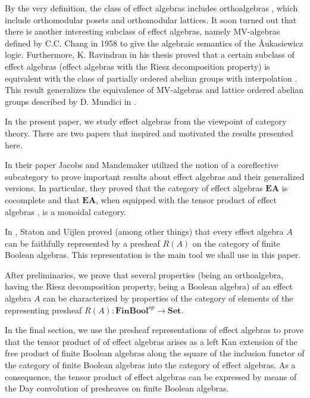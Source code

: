 \documentclass[smallextended]{svjour3}
\begin{document}
By the very definition, the class of effect algebras
includes orthoalgebras \cite{FouGreRut:FaSiO}, which include 
orthomodular posets and orthomodular lattices. It soon turned out \cite{ChoKop:BDP}
that there is another interesting subclass of effect algebras, namely MV-algebras
defined by C.C. Chang in 1958 \cite{Cha:AAoMVL} to give the algebraic semantics
of the Åukasiewicz logic. Furthermore, K. Ravindran in his thesis proved that a
certain subclass of effect algebras (effect algebras with the Riesz decomposition property)
is equivalent with the class of partially ordered abelian groups with interpolation \cite{Goo:POAGwI}.
This result generalizes the equivalence of MV-algebras and lattice ordered abelian groups described by
D. Mundici in \cite{Mun:IoAFCSAiLSC}.

In the present paper, we study effect algebras from the viewpoint of category theory.
There are two papers that inspired and motivated the results presented here. 

In their paper \cite{jacobs2012coreflections} Jacobs and Mandemaker utilized
the notion of a coreflective subcategory to prove important results about
effect algebras and their generalized versions.  In particular, they proved
that the category of effect algebras ${\mathbf{EA}}$ is cocomplete and that 
${\mathbf{EA}}$, when equipped with the tensor product
of effect algebras \cite{dvurevcenskij1995tensor}, is a monoidal category.

In \cite{staton2015effect}, Staton and Uijlen proved (among other things) that
every effect algebra $A$ can be faithfully represented by a presheaf $R(A)$ on
the category of finite Boolean algebras. This representation is the main tool
we shall use in this paper.

After preliminaries, we prove that several properties (being an orthoalgebra,
having the Riesz decomposition property, being a Boolean algebra) of an effect
algebra $A$ can be characterized by properties of the category of elements of
the representing presheaf $R(A):{\mathbf{FinBool}}^{op}\to{\mathbf{Set}}$. 

In the final section, we use the presheaf representations of effect algebras to prove that the
tensor product of of effect algebras arises as a left Kan extension of the free
product of finite Boolean algebras along the square of the inclusion functor 
of the category of finite Boolean algebras into the category of effect algebras. As a
consequence, the tensor product of effect algebras can be expressed by means of
the Day convolution of presheaves on finite Boolean algebras.
\end{document}
